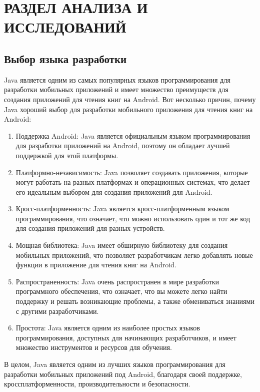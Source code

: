 \graphicspath{{./img}}
\chapter{РАЗДЕЛ АНАЛИЗА И ИССЛЕДОВАНИЙ}
\section{Выбор языка разработки}
Java является одним из самых популярных языков программирования
для разработки мобильных приложений и имеет множество преимуществ
для создания приложений для чтения книг на Android.
Вот несколько причин, почему Java хороший выбор для разработки
мобильного приложения для чтения книг на Android:

\begin{enumerate}
	\item Поддержка Android: Java является официальным языком
		программирования для разработки приложений на Android,
		поэтому он обладает лучшей поддержкой для этой платформы.
	\item Платформно-независимость: Java позволяет создавать приложения,
		которые могут работать на разных платформах и операционных системах,
		что делает его идеальным выбором для создания приложений для Android.
	\item Кросс-платформенность: Java является кросс-платформенным языком
		программирования, что означает, что можно использовать один
		и тот же код для создания приложений для разных устройств.
	\item Мощная библиотека: Java имеет обширную библиотеку
		для создания мобильных приложений, что позволяет
		разработчикам легко добавлять новые функции в приложение
		для чтения книг на Android.
	\item Распространенность: Java очень распространен в мире
		разработки программного обеспечения, что означает,
		что вы можете легко найти поддержку и решать возникающие проблемы,
		а также обмениваться знаниями с другими разработчиками.
	\item Простота: Java является одним из наиболее простых языков
		программирования, доступных для начинающих разработчиков,
		и имеет множество инструментов и ресурсов для обучения.
\end{enumerate}

В целом, Java является одним из лучших языков программирования
для разработки мобильных приложений под Android,
благодаря своей поддержке, кроссплатформенности,
производительности и безопасности.

